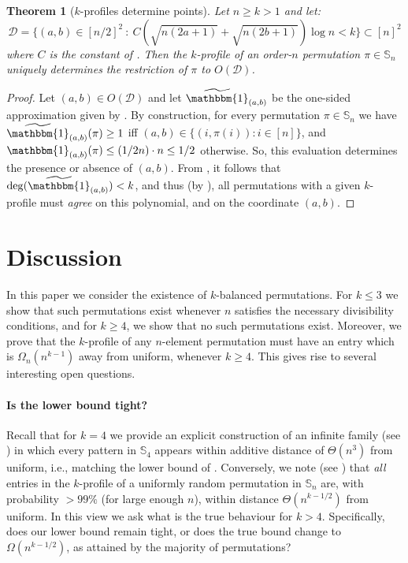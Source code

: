 \documentclass{article}
\newtheorem{theorem}{Theorem}[section]
\newcommand{\Sn}{\mathbb{S}_n}
\theoremstyle{remark}
\theoremstyle{plain}
\begin{document}
\begin{theorem}[$k$-profiles determine points]
    \label{thm:prof_to_points}
    Let $n \ge k > 1$ and let:
    \[
        \mathcal{D} = \Big\{ (a,b) \in \left[ n/2 \right]^2\ :\ C \left( \sqrt{n(2a+1)} + \sqrt{n(2b+1)}\right) \log n < k \Big\} \subset [n]^2
    \]
    where $C$ is the constant of .
    Then the $k$-profile of an order-$n$ permutation $\pi \in \Sn$ uniquely determines the restriction of $\pi$ to $O(\mathcal{D})$. 
\end{theorem}
\begin{proof}
    Let $(a,b) \in O(\mathcal{D})$ and let $\widetilde{\mathbbm{1}}_{(a,b)}$ be the one-sided approximation given by . By construction, for every permutation $\pi \in \Sn$ we have $\widetilde{\mathbbm{1}}_{(a,b)}(\pi) \ge 1$ iff $(a,b) \in \{(i, \pi(i)) : i \in [n]\}$, and $\mathbbm{1}_{(a,b)}(\pi) \le (1/2n) \cdot n \le 1/2$ otherwise. So, this evaluation determines the presence or absence of $(a,b)$. From , it follows that $\deg(\widetilde{\mathbbm{1}}_{(a,b)}) < k$, and thus (by ), all permutations with a given $k$-profile must \emph{agree} on this polynomial, and on the coordinate $(a,b)$.
\end{proof}
 \section{Discussion}
\label{sect:discussion}

In this paper we consider the existence of $k$-balanced permutations.
For $k \le 3$ we show that such permutations exist whenever $n$ satisfies the necessary divisibility conditions,
and for $k \ge 4$, we show that no such permutations exist.
Moreover, we prove that the $k$-profile of any $n$-element permutation must have an entry
which is $\Omega_n(n^{k-1})$ away from uniform, whenever $k \ge 4$.
This gives rise to several interesting open questions.

\paragraph{Is the lower bound tight?} 
Recall that for $k=4$ we provide an explicit construction of an infinite family (see )
in which every pattern in $\mathbb{S}_4$ appears within additive distance of $\Theta(n^{3})$ from uniform, i.e., matching the lower bound of .
Conversely, we note (see ) that \textit{all} entries in the $k$-profile of a uniformly random permutation in $\mathbb{S}_n$ 
are, with probability $>99\%$ (for large enough $n$), within distance $\Theta(n^{k - 1/2})$ from uniform. In this view we ask
what is the true behaviour for $k>4$. Specifically,
does our lower bound remain tight, or does the true bound change to $\Omega(n^{k-1/2})$, as attained by the majority of permutations?
\end{document}
